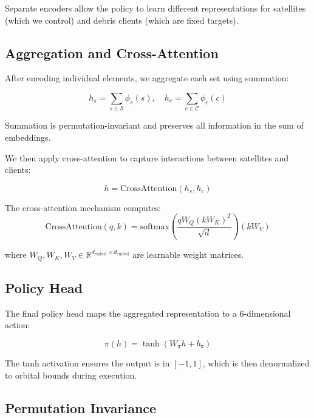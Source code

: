 Separate encoders allow the policy to learn different representations for satellites (which we control) and debris clients (which are fixed targets).

\subsection{Aggregation and Cross-Attention}

After encoding individual elements, we aggregate each set using summation:

\begin{equation}
    h_s = \sum_{s \in \mathcal{S}} \phi_s(s), \quad h_c = \sum_{c \in \mathcal{C}} \phi_c(c)
\end{equation}

Summation is permutation-invariant and preserves all information in the sum of embeddings.

We then apply cross-attention to capture interactions between satellites and clients:

\begin{equation}
    h = \text{CrossAttention}(h_s, h_c)
\end{equation}

The cross-attention mechanism computes:
\begin{equation}
    \text{CrossAttention}(q, k) = \text{softmax}\left(\frac{q W_Q (k W_K)^T}{\sqrt{d}}\right) (k W_V)
\end{equation}

where $W_Q, W_K, W_V \in \mathbb{R}^{d_{\text{embed}} \times d_{\text{embed}}}$ are learnable weight matrices.

\subsection{Policy Head}

The final policy head maps the aggregated representation to a 6-dimensional action:

\begin{equation}
    \pi(h) = \tanh\left(W_{\pi} h + b_{\pi}\right)
\end{equation}

The tanh activation ensures the output is in $[-1, 1]$, which is then denormalized to orbital bounds during execution.

\subsection{Permutation Invariance}

